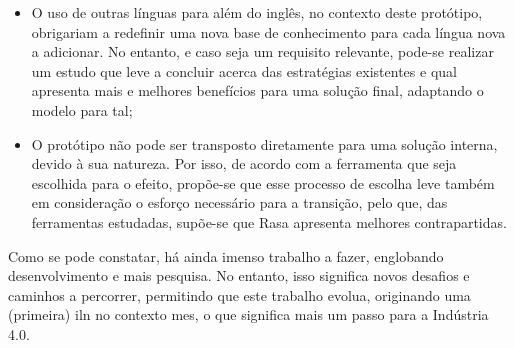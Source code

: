 \begin{itemize}
{    }
    \item 
    {
        O uso de outras línguas para além do inglês, no contexto deste protótipo, obrigariam a redefinir uma nova base de conhecimento para cada língua nova a adicionar. No entanto, e caso seja um requisito relevante, pode-se realizar um estudo que leve a concluir acerca das estratégias existentes e qual apresenta mais e melhores benefícios para uma solução final, adaptando o modelo para tal;
    }
    \item 
    {
        O protótipo não pode ser transposto diretamente para uma solução interna, devido à sua natureza. Por isso, de acordo com a ferramenta que seja escolhida para o efeito, propõe-se que esse processo de escolha leve também em consideração o esforço necessário para a transição, pelo que, das ferramentas estudadas, supõe-se que Rasa apresenta melhores contrapartidas.
    }
\end{itemize}

Como  se  pode  constatar, há  ainda  imenso  trabalho  a  fazer, englobando desenvolvimento e mais pesquisa. No entanto, isso significa novos desafios e caminhos a percorrer, permitindo que este trabalho evolua, originando uma (primeira) \gls{iln} no contexto \gls{mes}, o que significa mais um passo para a Indústria 4.0.